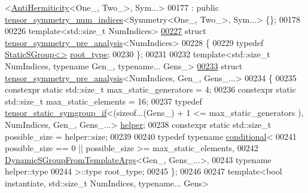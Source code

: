 \begin{DoxyCode}
      <\hyperlink{struct_eigen_1_1_anti_hermiticity}{AntiHermiticity}<One\_, Two\_>, Sym...>
00177   : \textcolor{keyword}{public} \hyperlink{struct_eigen_1_1internal_1_1tensor__symmetry__num__indices}{tensor\_symmetry\_num\_indices}<Symmetry<One\_, Two\_>, Sym...> \{\};
00178 
00226 \textcolor{keyword}{template}<std::\textcolor{keywordtype}{size\_t} NumIndices>
\hyperlink{struct_eigen_1_1internal_1_1tensor__symmetry__pre__analysis_3_01_num_indices_01_4}{00227} \textcolor{keyword}{struct }\hyperlink{struct_eigen_1_1internal_1_1tensor__symmetry__pre__analysis}{tensor\_symmetry\_pre\_analysis}<NumIndices>
00228 \{
00229   \textcolor{keyword}{typedef} \hyperlink{class_eigen_1_1_static_s_group}{StaticSGroup<>} \hyperlink{class_eigen_1_1_static_s_group}{root\_type};
00230 \};
00231 
00232 \textcolor{keyword}{template}<std::size\_t NumIndices, \textcolor{keyword}{typename} Gen\_, \textcolor{keyword}{typename}... Gens\_>
\hyperlink{struct_eigen_1_1internal_1_1tensor__symmetry__pre__analysis_3_01_num_indices_00_01_gen___00_01_gens___8_8_8_01_4}{00233} \textcolor{keyword}{struct }\hyperlink{struct_eigen_1_1internal_1_1tensor__symmetry__pre__analysis}{tensor\_symmetry\_pre\_analysis}<NumIndices, Gen\_, Gens\_...>
00234 \{
00235   constexpr \textcolor{keyword}{static} std::size\_t max\_static\_generators = 4;
00236   constexpr \textcolor{keyword}{static} std::size\_t max\_static\_elements = 16;
00237   \textcolor{keyword}{typedef} \hyperlink{struct_eigen_1_1internal_1_1tensor__static__symgroup__if}{tensor\_static\_symgroup\_if}<(\textcolor{keyword}{sizeof}...(Gens\_) + 1 <= max\_static\_generators
      ), NumIndices, Gen\_, Gens\_...> \hyperlink{struct_eigen_1_1internal_1_1tensor__static__symgroup__if}{helper};
00238   constexpr \textcolor{keyword}{static} std::size\_t possible\_size = helper::size;
00239 
00240   \textcolor{keyword}{typedef} \textcolor{keyword}{typename} \hyperlink{struct_eigen_1_1internal_1_1conditional}{conditional}<
00241     possible\_size == 0 || possible\_size >= max\_static\_elements,
00242     \hyperlink{class_eigen_1_1_dynamic_s_group_from_template_args}{DynamicSGroupFromTemplateArgs}<Gen\_, Gens\_...>,
00243     \textcolor{keyword}{typename} helper::type
00244   >::type root\_type;
00245 \};
00246 
00247 \textcolor{keyword}{template}<\textcolor{keywordtype}{bool} instantiate, std::size\_t NumIndices, \textcolor{keyword}{typename}... Gens>

\end{DoxyCode}
